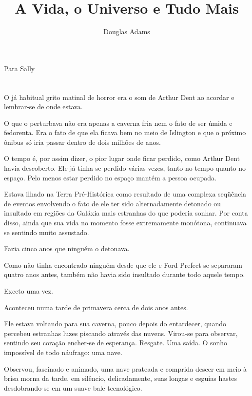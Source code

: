 \documentclass[eps,11pt]{book}
\begin{document}
\renewcommand{\chaptername}{Capítulo}

\title{A Vida, o Universo e Tudo Mais}
\author{Douglas Adams}

\maketitle

\newpage 
\thispagestyle{empty}
\flushbottom
Para Sally

\chapter{}

O já habitual grito matinal de horror era o som de Arthur Dent ao acordar e lembrar-se de onde estava.

O que o perturbava não era apenas a caverna fria nem o fato de ser úmida e fedorenta. Era o fato de que ela ficava bem no meio de Islington e que o próximo ônibus só iria passar dentro de dois milhões de anos.

O tempo é, por assim dizer, o pior lugar onde ficar perdido, como Arthur Dent havia descoberto. Ele já tinha se perdido várias vezes, tanto no tempo quanto no espaço. Pelo menos estar perdido no espaço mantém a pessoa ocupada.

Estava ilhado na Terra Pré-Histórica como resultado de uma complexa seqüência de eventos envolvendo o fato de ele ter sido alternadamente detonado ou insultado em regiões da Galáxia mais estranhas do que poderia sonhar. Por conta disso, ainda que sua vida no momento fosse extremamente monótona, continuava se sentindo muito assustado.

Fazia cinco anos que ninguém o detonava.

Como não tinha encontrado ninguém desde que ele e Ford Prefect se separaram quatro anos antes, também não havia sido insultado durante todo aquele tempo.

Exceto uma vez.

Aconteceu numa tarde de primavera cerca de dois anos antes.

Ele estava voltando para sua caverna, pouco depois do entardecer, quando percebeu estranhas luzes piscando através das nuvens. Virou-se para observar, sentindo seu coração encher-se de esperança. Resgate. Uma saída. O sonho impossível de todo náufrago: uma nave.

Observou, fascinado e animado, uma nave prateada e comprida descer em meio à brisa morna da tarde, em silêncio, delicadamente, suas longas e esguias hastes desdobrando-se em um suave bale tecnológico.
\end{document}
